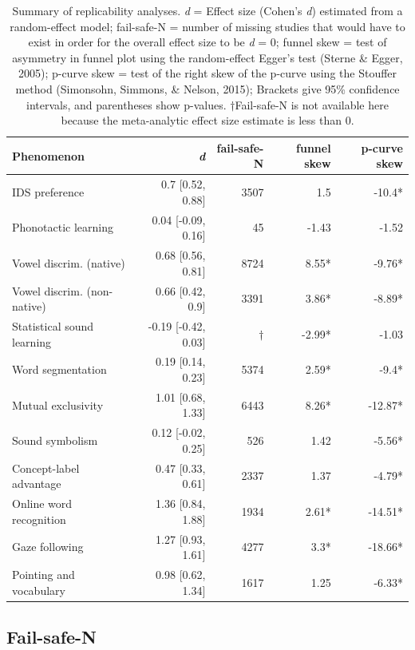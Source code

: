 \documentclass[english,floatsintext,man]{apa6}
\theoremstyle{definition}
\theoremstyle{definition}
\theoremstyle{remark}
\begin{document}
\begin{table}[t]
\footnotesize
\begin{tabular}{lrrrr}
\toprule
\textbf{Phenomenon} & \textbf{\textit{d}} & \textbf{fail-safe-N} & \textbf{funnel skew} & \textbf{p-curve skew}\\
\midrule

IDS preference & 0.7 [0.52, 0.88] & 3507 & 1.5 & -10.4*\\
Phonotactic learning & 0.04 [-0.09, 0.16] & 45 & -1.43 & -1.52\\
Vowel discrim. (native) & 0.68 [0.56, 0.81] & 8724 & 8.55* & -9.76*\\
Vowel discrim. (non-native) & 0.66 [0.42, 0.9] & 3391 & 3.86* & -8.89*\\
Statistical sound learning & -0.19 [-0.42, 0.03] & $\dagger$ & -2.99* & -1.03\\
Word segmentation & 0.19 [0.14, 0.23] & 5374 & 2.59* & -9.4*\\
Mutual exclusivity & 1.01 [0.68, 1.33] & 6443 & 8.26* & -12.87*\\
Sound symbolism & 0.12 [-0.02, 0.25] & 526 & 1.42 & -5.56*\\
Concept-label advantage & 0.47 [0.33, 0.61] & 2337 & 1.37 & -4.79*\\
Online word recognition & 1.36 [0.84, 1.88] & 1934 & 2.61* & -14.51*\\
Gaze following & 1.27 [0.93, 1.61] & 4277 & 3.3* & -18.66*\\
Pointing and vocabulary & 0.98 [0.62, 1.34] & 1617 & 1.25 & -6.33*\\

\bottomrule
\end{tabular}
\caption{Summary of replicability analyses. \textit{d} = Effect size (Cohen's {\it d}) estimated from a random-effect model; fail-safe-N = number of missing studies that would have to exist in order for the overall effect size to be {\it d} = 0; funnel skew = test of asymmetry in funnel plot using the random-effect Egger's test (Sterne \& Egger, 2005); p-curve skew = test of the right skew of the p-curve using the Stouffer method (Simonsohn, Simmons, \& Nelson, 2015); Brackets give 95\% confidence intervals, and parentheses show p-values. $\dagger$Fail-safe-N is not available here because the meta-analytic effect size estimate is less than 0.}
\end{table}

\subsection{Fail-safe-N}\label{fail-safe-n}
\end{document}
